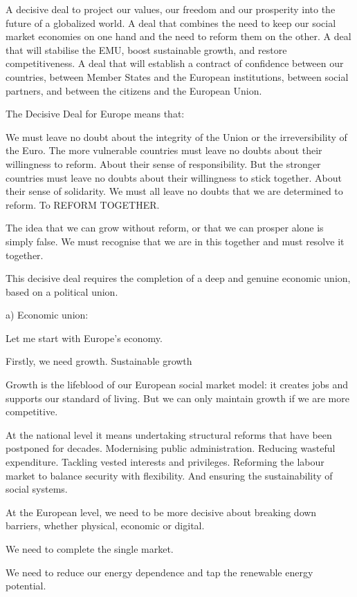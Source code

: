 \documentclass[a4paper,11pt]{article}
\begin{document}
A decisive deal to project our values, our freedom and our prosperity into the future of a globalized world. A deal that combines the need to keep our social market economies on one hand and the need to reform them on the other. A deal that will stabilise the EMU, boost sustainable growth, and restore competitiveness. A deal that will establish a contract of confidence between our countries, between Member States and the European institutions, between social partners, and between the citizens and the European Union.

The Decisive Deal for Europe means that:

We must leave no doubt about the integrity of the Union or the irreversibility of the Euro. The more vulnerable countries must leave no doubts about their willingness to reform. About their sense of responsibility. But the stronger countries must leave no doubts about their willingness to stick together. About their sense of solidarity. We must all leave no doubts that we are determined to reform. To REFORM TOGETHER.

The idea that we can grow without reform, or that we can prosper alone is simply false. We must recognise that we are in this together and must resolve it together.

This decisive deal requires the completion of a deep and genuine economic union, based on a political union.

a) Economic union:

Let me start with Europe's economy.

Firstly, we need growth. Sustainable growth

Growth is the lifeblood of our European social market model: it creates jobs and supports our standard of living. But we can only maintain growth if we are more competitive.

At the national level it means undertaking structural reforms that have been postponed for decades. Modernising public administration. Reducing wasteful expenditure. Tackling vested interests and privileges. Reforming the labour market to balance security with flexibility. And ensuring the sustainability of social systems.

At the European level, we need to be more decisive about breaking down barriers, whether physical, economic or digital.

We need to complete the single market.

We need to reduce our energy dependence and tap the renewable energy potential.
\end{document}
